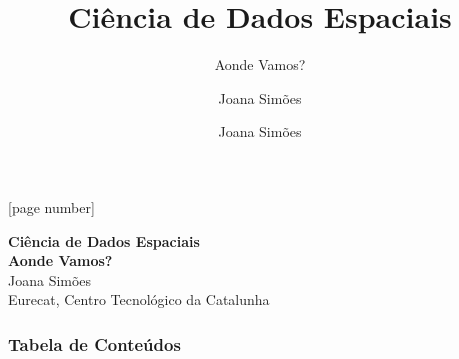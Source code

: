 \documentclass[hyperref={pdfpagelabels=true}]{beamer}
\title{Ci\^{e}ncia de Dados Espaciais}
\subtitle{Aonde Vamos?}
\author{Joana Sim\~{o}es}
\author[shortname]{Joana Sim\~{o}es \inst{1}}
\institute[shortinst]{\inst{1} Eurecat, Centro Tecnol\'{o}gico da Catalunha}
\begin{document}
[page number]


{  
\begin{frame}[plain]
    \vspace{10em}
    \begin{titleBox}
        \centering \textbf{Ci\^{e}ncia de Dados Espaciais}\\
        \textbf{Aonde Vamos?}\\  
        \justify
        \small{Joana Sim\~{o}es}\\
        \small{Eurecat, Centro Tecnol\'{o}gico da Catalunha\\
        }
        
    \end{titleBox}

\end{frame} 
} 
 
\begin{frame}
\frametitle{Tabela de Conte\'{u}dos}
\tiny{
\tableofcontents}
\end{frame}

\end{document}
